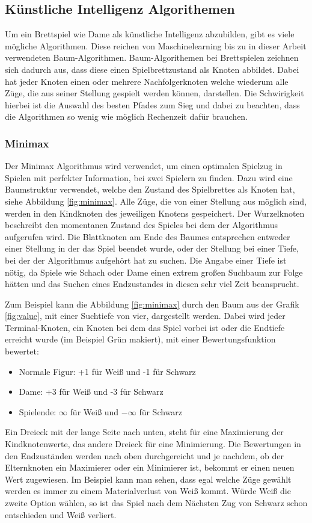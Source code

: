 \documentclass[12pt,a4paper,bibliography=totocnumbered,listof=totocnumbered]{article}
\begin{document}
\subsection{Künstliche Intelligenz Algorithemen}
Um ein Brettspiel wie Dame als künstliche Intelligenz abzubilden, gibt es viele mögliche Algorithmen.
Diese reichen von Maschinelearning bis zu in dieser Arbeit verwendeten Baum-Algorithmen.
Baum-Algorithemen bei Brettspielen zeichnen sich dadurch aus, dass diese einen Spielbrettzustand als Knoten abbildet.
Dabei hat jeder Knoten einen oder mehrere Nachfolgerknoten welche wiederum alle Züge, die aus seiner Stellung gespielt werden können, darstellen.
Die Schwirigkeit hierbei ist die Auswahl des besten Pfades zum Sieg und dabei zu beachten, dass die Algorithmen so wenig wie möglich 
Rechenzeit dafür brauchen.

\subsubsection{Minimax}
\label{chap:Minimax}
Der Minimax Algorithmus wird verwendet, um einen optimalen Spielzug in Spielen mit perfekter Information, bei zwei Spielern
zu finden. Dazu wird eine Baumstruktur verwendet, welche den Zustand des Spielbrettes als Knoten hat, siehe Abbildung \ref{fig:minimax}.
Alle Züge, die von einer Stellung aus möglich sind, werden in den Kindknoten des jeweiligen Knotens gespeichert.
Der Wurzelknoten beschreibt den momentanen Zustand des Spieles bei dem der Algorithmus aufgerufen wird. Die Blattknoten am Ende des Baumes
entsprechen entweder einer Stellung in der das Spiel beendet wurde, oder der Stellung bei einer Tiefe, bei der der Algorithmus 
aufgehört hat zu suchen. Die Angabe einer Tiefe ist nötig,
da Spiele wie Schach oder Dame einen extrem großen Suchbaum zur Folge hätten und das Suchen eines Endzustandes in diesen sehr viel Zeit
beansprucht. \cite{MinimaxComparison}


Zum Beispiel kann die Abbildung \ref{fig:minimax} durch den Baum aus der Grafik \ref{fig:value}, mit einer Suchtiefe von vier, dargestellt werden.
Dabei wird jeder Terminal-Knoten, ein Knoten bei dem das Spiel vorbei ist oder die Endtiefe erreicht wurde (im Beispiel Grün makiert), 
mit einer Bewertungsfunktion bewertet:
\begin{itemize}
    \item Normale Figur: +1 für Weiß und -1 für Schwarz
    \item Dame: +3 für Weiß und -3 für Schwarz
    \item Spielende: $\infty$ für Weiß und $-\infty$ für Schwarz
\end{itemize} 
Ein Dreieck mit der lange Seite nach unten, steht für eine Maximierung der Kindknotenwerte, das andere Dreieck für eine
Minimierung. Die Bewertungen in den Endzuständen werden nach oben durchgereicht und je nachdem, ob der Elternknoten ein Maximierer oder ein
Minimierer ist, bekommt er einen neuen Wert zugewiesen.
Im Beispiel kann man sehen, dass egal welche Züge gewählt werden es immer zu einem Materialverlust von Weiß kommt. Würde Weiß
die zweite Option wählen, so ist das Spiel nach dem Nächsten Zug von Schwarz schon entschieden und Weiß verliert. 
\end{document}

